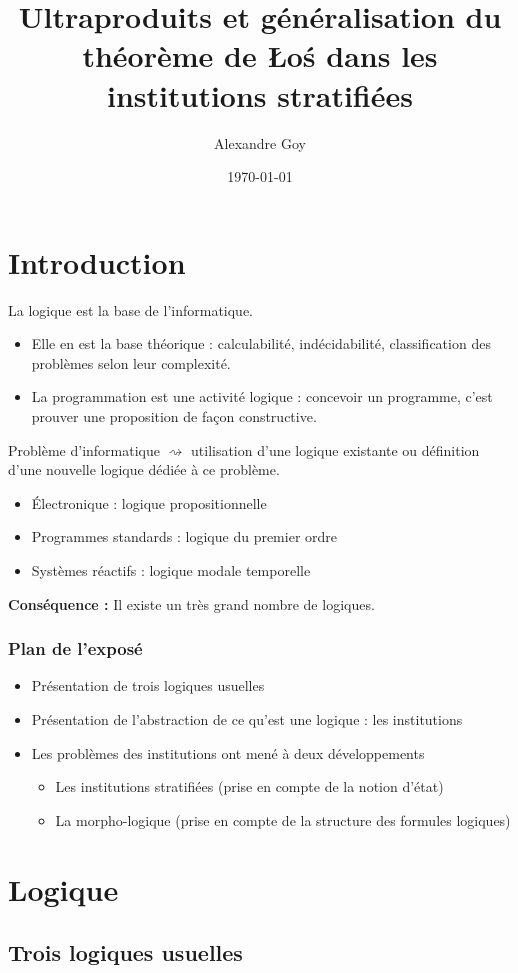 \documentclass{beamer}
\title[Morpho-logique]{Ultraproduits et généralisation du théorème de \L o\'s dans les institutions stratifiées}
\author{Alexandre Goy}
\institute[Parcours MP]
{
CentraleSupélec, Parcours Maths-Physique
}
\date{\today}
\newcommand{\itemz}{\item[$\triangleright$]}
\begin{document}
\begin{frame}
\titlepage
\end{frame}

\section*{Introduction}

\begin{frame}
La logique est la base de l'informatique.
\begin{itemize}
\itemz Elle en est la base théorique : calculabilité, indécidabilité, classification des problèmes selon leur complexité.
\itemz La programmation est une activité logique : concevoir un programme, c'est prouver une proposition de façon constructive.
\end{itemize}
\pause
Problème d'informatique $\rightsquigarrow$ utilisation d'une logique existante ou définition d'une nouvelle logique dédiée à ce problème. \pause 
\begin{itemize}
\itemz \'Electronique : logique propositionnelle
\itemz Programmes standards : logique du premier ordre
\itemz Systèmes réactifs : logique modale temporelle
\end{itemize} \pause 
\textbf{Conséquence :} Il existe un très grand nombre de logiques.

\end{frame}

\begin{frame}
\frametitle{Plan de l'exposé}
\begin{itemize}
\itemz Présentation de trois logiques usuelles
\itemz Présentation de l'abstraction de ce qu'est une logique : les institutions \cite{Dia08}
\itemz Les problèmes des institutions ont mené à deux développements
\begin{itemize}
\itemz Les institutions stratifiées (prise en compte de la notion d'état) \cite{Aig07}
\itemz La morpho-logique (prise en compte de la structure des formules logiques) \cite{Aig17}
\end{itemize}
\end{itemize}
\end{frame}

\section{Logique}

\subsection{Trois logiques usuelles}
\end{document}
